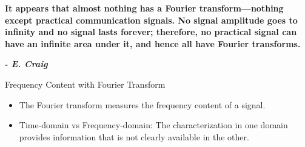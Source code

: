 \documentclass[aspectratio=169,xcolor=dvipsnames,svgnames,x11names,fleqn]{beamer}
\begin{document}
\begin{frame}{}
    \Large
    \begin{center}
        \textbf{It appears that almost nothing has a Fourier transform—nothing except practical communication signals. No signal amplitude goes to infinity and no signal lasts forever; therefore, no practical signal can have an infinite area under it, and hence all have Fourier transforms.}
        
        \hfill \textbf{-  \textit{E. Craig}}
    \end{center}
\end{frame}

\begin{frame}{Frequency Content with Fourier Transform}
    \begin{itemize}
        \item The Fourier transform measures the frequency content of a signal.
\item Time-domain vs Frequency-domain: The characterization in one domain provides information that is not clearly available in the other.

    \end{itemize}
\end{frame}

    


    


\end{document}
